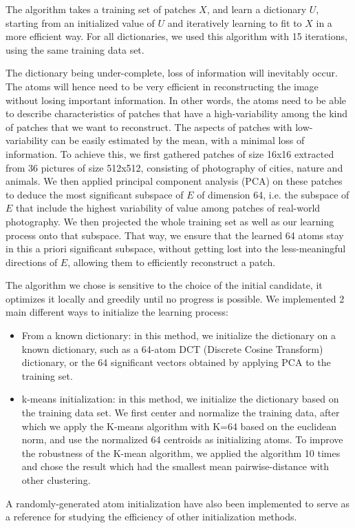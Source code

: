 The algorithm takes a training set of patches $X$, and learn a dictionary $U$, starting from an initialized value of $U$ and iteratively learning to fit to $X$ in a more efficient way. 
For all dictionaries, we used this algorithm with 15 iterations, using the same training data set.

The dictionary being under-complete, loss of information will inevitably occur. The atoms will hence need to be very efficient in reconstructing the image without losing important information. In other words, the atoms need to be able to describe characteristics of patches that have a high-variability among the kind of patches that we want to reconstruct. The aspects of patches with low-variability can be easily estimated by the mean, with a minimal loss of information. 
To achieve this, we first gathered patches of size 16x16 extracted from 36 pictures of size 512x512, consisting of photography of cities, nature and animals. We then applied principal component analysis (PCA) on these patches to deduce the most significant subspace of $E$ of dimension 64, i.e. the subspace of $E$ that include the highest variability of value among patches of real-world photography. We then projected the whole training set as well as our learning process onto that subspace. That way, we ensure that the learned 64 atoms stay in this a priori significant subspace, without getting lost into the less-meaningful directions of $E$, allowing them to efficiently reconstruct a patch.

The algorithm we chose is sensitive to the choice of the initial candidate, it optimizes it locally and greedily until no progress is possible. We implemented 2 main different ways to initialize the learning process:
\begin{itemize}
   \item From a known dictionary: in this method, we initialize the dictionary on a known dictionary, such as a 64-atom DCT (Discrete Cosine Transform) dictionary, or the 64 significant vectors obtained by applying PCA to the training set.  
   \item k-means initialization: in this method, we initialize the dictionary based on the training data set. We first center and normalize the training data, after which we apply the K-means algorithm with K=64 based on the euclidean norm, and use the normalized 64 centroids as initializing atoms. To improve the robustness of the K-mean algorithm, we applied the algorithm 10 times and chose the result which had the smallest mean pairwise-distance with other clustering. 
\end{itemize}
A randomly-generated atom initialization have also been implemented to serve as a reference for studying the efficiency of other initialization methods. 

